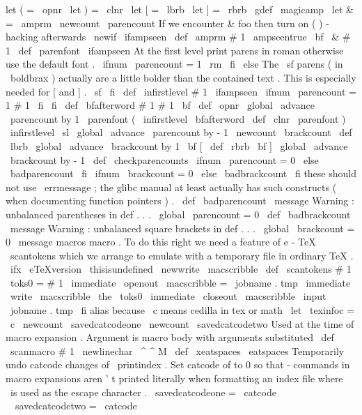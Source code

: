 {{{{{let
(
=
\
opnr
\
let
)
=
\
clnr
\
let
[
=
\
lbrb
\
let
]
=
\
rbrb
}
\
gdef
\
magicamp
{
\
let
&
=
\
amprm
}
}
\
newcount
\
parencount
%
If
we
encounter
&
foo
then
turn
on
(
)
-
hacking
afterwards
\
newif
\
ifampseen
\
def
\
amprm
#
1
{
\
ampseentrue
{
\
bf
\
&
#
1
}
}
\
def
\
parenfont
{
%
\
ifampseen
%
At
the
first
level
print
parens
in
roman
%
otherwise
use
the
default
font
.
\
ifnum
\
parencount
=
1
\
rm
\
fi
\
else
%
The
\
sf
parens
(
in
\
boldbrax
)
actually
are
a
little
bolder
than
%
the
contained
text
.
This
is
especially
needed
for
[
and
]
.
\
sf
\
fi
}
\
def
\
infirstlevel
#
1
{
%
\
ifampseen
\
ifnum
\
parencount
=
1
#
1
%
\
fi
\
fi
}
\
def
\
bfafterword
#
1
{
#
1
\
bf
}
\
def
\
opnr
{
%
\
global
\
advance
\
parencount
by
1
{
\
parenfont
(
}
%
\
infirstlevel
\
bfafterword
}
\
def
\
clnr
{
%
{
\
parenfont
)
}
%
\
infirstlevel
\
sl
\
global
\
advance
\
parencount
by
-
1
}
\
newcount
\
brackcount
\
def
\
lbrb
{
%
\
global
\
advance
\
brackcount
by
1
{
\
bf
[
}
%
}
\
def
\
rbrb
{
%
{
\
bf
]
}
%
\
global
\
advance
\
brackcount
by
-
1
}
\
def
\
checkparencounts
{
%
\
ifnum
\
parencount
=
0
\
else
\
badparencount
\
fi
\
ifnum
\
brackcount
=
0
\
else
\
badbrackcount
\
fi
}
%
these
should
not
use
\
errmessage
;
the
glibc
manual
at
least
actually
%
has
such
constructs
(
when
documenting
function
pointers
)
.
\
def
\
badparencount
{
%
\
message
{
Warning
:
unbalanced
parentheses
in
def
.
.
.
}
%
\
global
\
parencount
=
0
}
\
def
\
badbrackcount
{
%
\
message
{
Warning
:
unbalanced
square
brackets
in
def
.
.
.
}
%
\
global
\
brackcount
=
0
}
\
message
{
macros
}
%
macro
.
%
To
do
this
right
we
need
a
feature
of
e
-
TeX
\
scantokens
%
which
we
arrange
to
emulate
with
a
temporary
file
in
ordinary
TeX
.
\
ifx
\
eTeXversion
\
thisisundefined
\
newwrite
\
macscribble
\
def
\
scantokens
#
1
{
%
\
toks0
=
{
#
1
}
%
\
immediate
\
openout
\
macscribble
=
\
jobname
.
tmp
\
immediate
\
write
\
macscribble
{
\
the
\
toks0
}
%
\
immediate
\
closeout
\
macscribble
\
input
\
jobname
.
tmp
}
\
fi
%
alias
because
\
c
means
cedilla
in
tex
or
math
\
let
\
texinfoc
=
\
c
\
newcount
\
savedcatcodeone
\
newcount
\
savedcatcodetwo
%
Used
at
the
time
of
macro
expansion
.
%
Argument
is
macro
body
with
arguments
substituted
\
def
\
scanmacro
#
1
{
%
\
newlinechar
\
^
^
M
\
def
\
xeatspaces
{
\
eatspaces
}
%
%
%
Temporarily
undo
catcode
changes
of
\
printindex
.
Set
catcode
of
to
%
0
so
that
-
commands
in
macro
expansions
aren
'
t
printed
literally
when
%
formatting
an
index
file
where
\
is
used
as
the
escape
character
.
\
savedcatcodeone
=
\
catcode
\
\
savedcatcodetwo
=
\
catcode
\
}}}}
